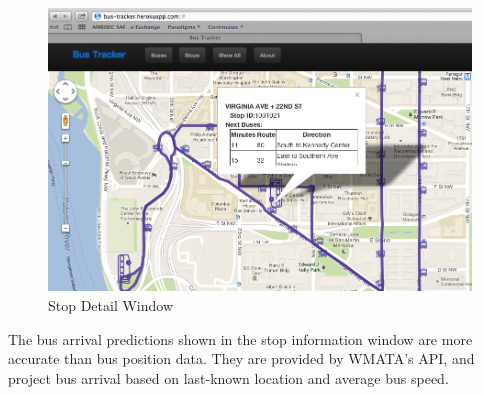 \documentclass[12pt]{report}
\begin{document}
\begin{appendices}
\begin{figure}[ht]
  \centerline{\includegraphics[width=\textwidth]{stop-info-bubble.png}}
  \caption{Stop Detail Window}
  \label{fig:stop-details}
\end{figure}

The bus arrival predictions shown in the stop information window are more accurate than bus position data.  They are provided by WMATA's API, and project bus arrival based on last-known location and average bus speed.


\end{appendices}
\end{document}
